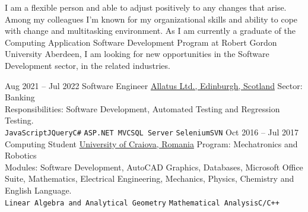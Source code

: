 \documentclass[10pt]{Darie-Dragos_Mitoiu_Document.cls}
\begin{document}
    \begin{minipage}[t]{0.4\textwidth}
        \vspace{-\baselineskip}

        I am a flexible person and able to adjust positively to any changes that arise. Among
        my colleagues I'm known for my organizational skills and ability to cope with change
        and multitasking environment.
        As I am currently a graduate of the Computing Application Software Development
        Program at Robert Gordon University Aberdeen, I am looking for new opportunities in
        the Software Development sector, in the related industries.
    \end{minipage}
    \hfill %
    \begin{minipage}[t]{0.5\textwidth}
        \vspace{-\baselineskip}
        \begin{barchart}{5.5}
        \end{barchart}
    \end{minipage}



    \begin{entrylist}
        \entry
        {Aug 2021 -- Jul 2022}
        {Software Engineer}
        {\href{https://www.allatus.co.uk}{Allatus Ltd., Edinburgh, Scotland}}
        {Sector: Banking \\
        Responsibilities:
        Software Development, Automated Testing and Regression Testing.\\
        \texttt{JavaScript}\slashsep\texttt{JQuery}\slashsep\texttt{C\#}
        \slashsep\texttt{ASP.NET MVC}\slashsep\texttt{SQL Server}
        \slashsep\texttt{Selenium}\slashsep\texttt{SVN}}
        \entry
        {Oct 2016 -- Jul 2017}
        {Computing Student}
        {\href{https://www.ucv.ro/en}{University of Craiova, Romania}}
        {Program: Mechatronics and Robotics \\
        Modules:
        Software Development, AutoCAD Graphics, Databases, Microsoft Office Suite,
            Mathematics, Electrical Engineering, Mechanics, Physics,
            Chemistry and English Language.\\
            \texttt{Linear Algebra and Analytical Geometry}
            \slashsep\texttt{Mathematical Analysis}\slashsep\texttt{C/C++}}
    \end{entrylist}
\end{document}
